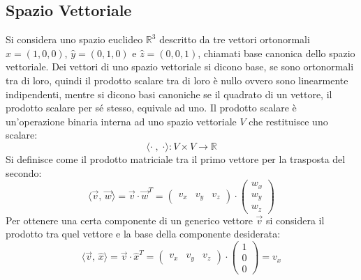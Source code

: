 \documentclass{article}
\numberwithin{equation}{subsection}
\begin{document}
\subsection{Spazio Vettoriale}

Si considera uno spazio euclideo $\mathbb{R}^3$ descritto da tre vettori ortonormali $\hat x=(1,0,0)$, $\hat y=(0,1,0)$ e $\hat z=(0,0,1)$, chiamati base canonica dello spazio vettoriale. 
Dei vettori di uno spazio vettoriale si dicono base, se sono ortonormali tra di loro, quindi il prodotto scalare tra di loro è nullo ovvero sono linearmente indipendenti, 
mentre si dicono basi canoniche se il quadrato di un vettore, il prodotto scalare per sé stesso, equivale ad uno. 
Il prodotto scalare è un'operazione binaria interna ad uno spazio vettoriale $V$ che restituisce uno scalare:
\begin{equation*}
    \langle \cdot \; , \; \cdot \rangle : V \times V  \rightarrow \mathbb{R}
\end{equation*}
Si definisce come il prodotto matriciale tra il primo vettore per la trasposta del secondo:
\begin{equation*}
    \langle\vec v,\,\vec w\rangle=\vec v\cdot \vec w^T=\begin{pmatrix}
        v_x &v_y&v_z
    \end{pmatrix}\cdot\begin{pmatrix}
        w_x\\ w_y \\ w_z
    \end{pmatrix}
\end{equation*} 
Per ottenere una certa componente di un generico vettore $\vec{v}$ si considera il prodotto tra quel vettore e la base della componente desiderata:
\begin{equation*}
    \langle\vec v,\,\hat x\rangle=\vec v\cdot \hat x^T=\begin{pmatrix}
        v_x &v_y&v_z
    \end{pmatrix}\cdot\begin{pmatrix}
        1\\ 0 \\0
    \end{pmatrix}=v_x
\end{equation*} 
\end{document}

